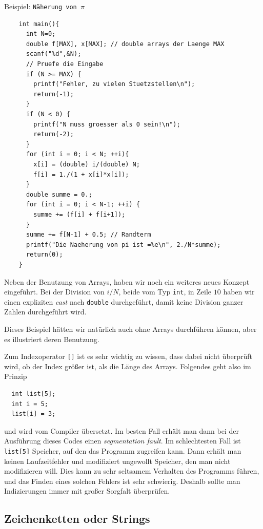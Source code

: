 \begin{myexampleprogram}{Beispiel: \texttt{Näherung von $\pi$}}
\begin{lstlisting}
    int main(){
      int N=0;
      double f[MAX], x[MAX]; // double arrays der Laenge MAX
      scanf("%d",&N);
      // Pruefe die Eingabe
      if (N >= MAX) {
        printf("Fehler, zu vielen Stuetzstellen\n");
        return(-1);
      }
      if (N < 0) {
        printf("N muss groesser als 0 sein!\n");
        return(-2);
      }
      for (int i = 0; i < N; ++i){
        x[i] = (double) i/(double) N;
        f[i] = 1./(1 + x[i]*x[i]);
      }
      double summe = 0.;
      for (int i = 0; i < N-1; ++i) {
        summe += (f[i] + f[i+1]);
      }
      summe += f[N-1] + 0.5; // Randterm
      printf("Die Naeherung von pi ist =%e\n", 2./N*summe);
      return(0);
    }
  \end{lstlisting}
  Neben der Benutzung von Arrays, haben wir noch ein weiteres neues Konzept eingeführt.
  Bei der Division von $i/N$, beide vom Typ \verb|int|, in Zeile $10$ haben wir einen expliziten \emph{cast} nach \verb|double| durchgeführt, damit keine Division ganzer Zahlen durchgeführt wird.
  
  Dieses Beispiel hätten wir natürlich auch ohne Arrays durchführen können, aber es illustriert deren Benutzung.
\end{myexampleprogram}
Zum Indexoperator \verb|[]| ist es sehr wichtig zu wissen, dass dabei nicht überprüft wird, ob der Index größer ist, als die Länge des Arrays.
Folgendes geht also im Prinzip
\begin{lstlisting}
  int list[5];
  int i = 5;
  list[i] = 3;
\end{lstlisting}
und wird vom Compiler übersetzt. 
Im besten Fall erhält man dann bei der Ausführung dieses Codes einen \emph{segmentation fault}.
Im schlechtesten Fall ist \verb|list[5]| Speicher, auf den das Programm zugreifen kann.
Dann erhält man keinen Laufzeitfehler und modifiziert ungewollt Speicher, den man nicht modifizieren will.
Dies kann zu sehr seltsamem Verhalten des Programms führen, und das Finden eines solchen Fehlers ist sehr schwierig.
Deshalb sollte man Indizierungen immer mit großer Sorgfalt überprüfen.

\subsection{Zeichenketten oder Strings}

